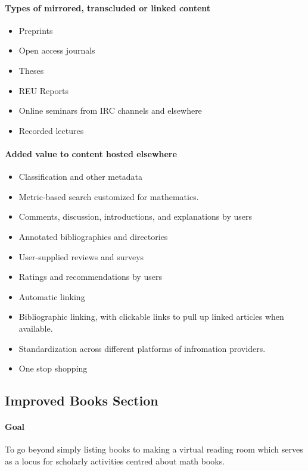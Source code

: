 \paragraph{Types of mirrored, transcluded or linked content}

\begin{itemize}
\item
  Preprints
\item
  Open access journals
\item
  Theses
\item
  REU Reports
\item
  Online seminars from IRC channels and elsewhere
\item
  Recorded lectures
\end{itemize}

\paragraph{Added value to content hosted elsewhere}

\begin{itemize}
\item
  Classification and other metadata
\item
  Metric-based search customized for mathematics.
\item
  Comments, discussion, introductions, and explanations by users
\item
  Annotated bibliographies and directories
\item
  User-supplied reviews and surveys
\item
  Ratings and recommendations by users
\item
  Automatic linking
\item
  Bibliographic linking, with clickable links to pull up linked articles
  when available.
\item
  Standardization across different platforms of infromation providers.
\item
  One stop shopping
\end{itemize}
\subsection{Improved Books Section}

\paragraph{Goal} To go beyond simply listing books to making a virtual reading room
which serves as a locus for scholarly activities centred about math
books.

